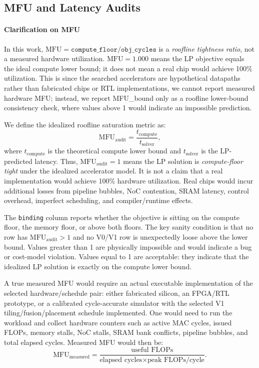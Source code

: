 \subsection{MFU and Latency Audits}
\label{app:mfu}
\paragraph{Clarification on MFU}
In this work, $\mathrm{MFU} = \texttt{compute\_floor} / \texttt{obj\_cycles}$
is a \emph{roofline tightness ratio}, not a measured hardware utilization.
$\mathrm{MFU} = 1.000$ means the LP objective equals the ideal compute
lower bound; it does not mean a real chip would achieve 100\% utilization. This is since the searched accelerators are hypothetical datapaths rather than fabricated chips or RTL implementations, we cannot report measured hardware MFU; instead, we report MFU\_bound only as a roofline lower-bound consistency check, where values above 1 would indicate an impossible prediction.

\noindent We define the idealized roofline saturation metric as:
\begin{equation}
    \mathrm{MFU}_{\mathrm{audit}}
    = \frac{t_{\mathrm{compute}}}{t_{\mathrm{solver}}},
    \label{eq:mfu_audit}
\end{equation}
where $t_{\mathrm{compute}}$ is the theoretical compute lower bound and
$t_{\mathrm{solver}}$ is the LP-predicted latency. Thus,
$\mathrm{MFU}_{\mathrm{audit}} = 1$ means the LP solution is
\emph{compute-floor tight} under the idealized accelerator model. It is
not a claim that a real implementation would achieve 100\% hardware
utilization. Real chips would incur additional losses from pipeline
bubbles, NoC contention, SRAM latency, control overhead, imperfect
scheduling, and compiler/runtime effects.

\noindent The \texttt{binding} column reports whether the objective is
sitting on the compute floor, the memory floor, or above both floors.
The key sanity condition is that no row has $\mathrm{MFU}_{\mathrm{audit}} > 1$
and no V0/V1 row is unexpectedly loose above the lower bound.
Values greater than 1 are physically impossible and would indicate a bug
or cost-model violation. Values equal to 1 are acceptable: they indicate
that the idealized LP solution is exactly on the compute lower bound.




A true measured MFU would require an actual executable implementation of
the selected hardware/schedule pair: either fabricated silicon, an
FPGA/RTL prototype, or a calibrated cycle-accurate simulator with the
selected V1 tiling/fusion/placement schedule implemented. One would need
to run the workload and collect hardware counters such as active MAC cycles, issued FLOPs, memory stalls, NoC stalls, SRAM bank conflicts,
pipeline bubbles, and total elapsed cycles. Measured MFU would then be:
\begin{equation}
    \mathrm{MFU}_{\mathrm{measured}}
    = \frac{\text{useful FLOPs}}
           {\text{elapsed cycles} \times \text{peak FLOPs/cycle}}.
    \label{eq:mfu_measured}
\end{equation}

